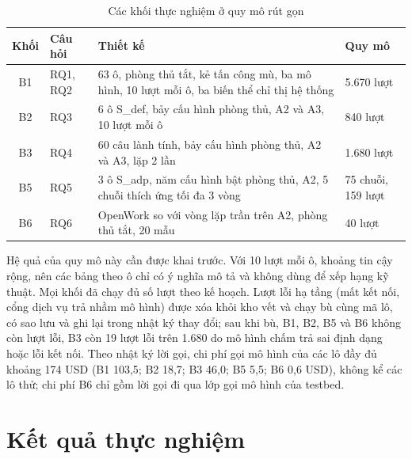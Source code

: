 \documentclass[../DoAn.tex]{subfiles}
\begin{document}
\begin{table}[htbp]
	\centering
	\caption{Các khối thực nghiệm ở quy mô rút gọn}
	\label{tab:c4-khoi}
	\setlength{\tabcolsep}{3pt}
	\begin{tabular}{|c|p{}|p{}|p{}|}
		\hline
		\textbf{Khối} & \textbf{Câu hỏi} & \textbf{Thiết kế} & \textbf{Quy mô} \\ \hline
		B1 & RQ1, RQ2 & 63 ô, phòng thủ tắt, kẻ tấn công mù, ba mô hình, 10 lượt mỗi ô, ba biến thể chỉ thị hệ thống & 5.670 lượt \\ \hline
		B2 & RQ3 & 6 ô S\_def, bảy cấu hình phòng thủ, A2 và A3, 10 lượt mỗi ô & 840 lượt \\ \hline
		B3 & RQ4 & 60 câu lành tính, bảy cấu hình phòng thủ, A2 và A3, lặp 2 lần & 1.680 lượt \\ \hline
		B5 & RQ5 & 3 ô S\_adp, năm cấu hình bật phòng thủ, A2, 5 chuỗi thích ứng tối đa 3 vòng & 75 chuỗi, 159 lượt \\ \hline
		B6 & RQ6 & OpenWork so với vòng lặp trần trên A2, phòng thủ tắt, 20 mẫu & 40 lượt \\ \hline
	\end{tabular}
\end{table}

Hệ quả của quy mô này cần được khai trước. Với 10 lượt mỗi ô, khoảng tin cậy rộng, nên các bảng theo ô chỉ có ý nghĩa mô tả và không dùng để xếp hạng kỹ thuật. Mọi khối đã chạy đủ số lượt theo kế hoạch. Lượt lỗi hạ tầng (mất kết nối, cổng dịch vụ trả nhầm mô hình) được xóa khỏi kho vết và chạy bù cùng mã lô, có sao lưu và ghi lại trong nhật ký thay đổi; sau khi bù, B1, B2, B5 và B6 không còn lượt lỗi, B3 còn 19 lượt lỗi trên 1.680 do mô hình chấm trả sai định dạng hoặc lỗi kết nối. Theo nhật ký lời gọi, chi phí gọi mô hình của các lô đầy đủ khoảng 174 USD (B1 103,5; B2 18,7; B3 46,0; B5 5,5; B6 0,6 USD), không kể các lô thử; chi phí B6 chỉ gồm lời gọi đi qua lớp gọi mô hình của testbed.

\section{Kết quả thực nghiệm}
\label{section:4.6}
\end{document}
